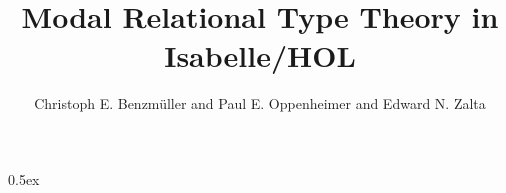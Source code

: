 \documentclass[11pt,a4paper]{article}
\begin{document}
\title{Modal Relational Type Theory in Isabelle/HOL}
\author{Christoph E. Benzm\"uller and Paul E. Oppenheimer and Edward
  N. Zalta}
\maketitle




\parindent 0pt\parskip 0.5ex









\pagebreak
\scriptsize

\end{document}

